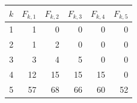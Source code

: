 \begin{tabular}{r r r r r r}
\toprule
$k$ & $F_{k,1}$ & $F_{k,2}$ & $F_{k,3}$ & $F_{k,4}$ & $F_{k,5}$ \\
\midrule
1 & 1 & 0 & 0 & 0 & 0 \\
2 & 1 & 2 & 0 & 0 & 0 \\
3 & 3 & 4 & 5 & 0 & 0 \\
4 & 12 & 15 & 15 & 15 & 0 \\
5 & 57 & 68 & 66 & 60 & 52 \\
\bottomrule
\end{tabular}
